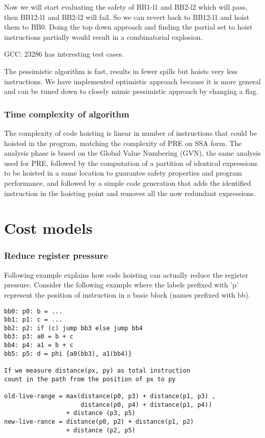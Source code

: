 \documentclass{sig-alternate}
\begin{document}
Now we will start evaluating the safety of BB1-l1 and BB2-l2 which
will pass, then BB12-l1 and BB2-l2 will fail.  So we can revert back
to BB12-l1 and hoist them to BB0. Doing the top down approach and
finding the partial set to hoist instructions partially would result
in a combinatorial explosion.

GCC: 23286 has interesting test cases.

The pessimistic algorithm is fast, results in fewer spills but hoists very less
instructions. We have implemented optimistic approach because it is more general
and can be tuned down to closely mimic pessimistic approach by changing a flag.


\subsubsection{Time complexity of algorithm}
The complexity of code hoisting is linear in number of instructions that could
be hoisted in the program, matching the complexity of PRE on SSA form.  The
analysis phase is based on the Global Value Numbering (GVN), the same analysis
used for PRE, followed by the computation of a partition of identical
expressions to be hoisted in a same location to guarantee safety properties and
program performance, and followed by a simple code generation that adds the
identified instruction in the hoisting point and removes all the now redundant
expressions.





\section{Cost models}

\subsubsection{Reduce register pressure}
\label{hoist:reg-pressure}
Following example explains how code hoisting can actually reduce the register pressure.
Consider the following example where the labels prefixed with 'p' represent the position of
instruction in a basic block (names prefixed with bb).

\begin{verbatim}
bb0: p0: b = ...
bb1: p1: c = ...
bb2: p2: if (c) jump bb3 else jump bb4
bb3: p3: a0 = b + c
bb4: p4: a1 = b + c
bb5: p5: d = phi {a0(bb3), a1(bb4)}

If we measure distance(px, py) as total instruction
count in the path from the position of px to py

old-live-range = max(distance(p0, p3) + distance(p1, p3) ,
                     distance(p0, p4) + distance(p1, p4))
                 + distance (p3, p5)
new-live-rance = distance(p0, p2) + distance(p1, p2)
                 + distance (p2, p5)
\end{verbatim}
\end{document}
